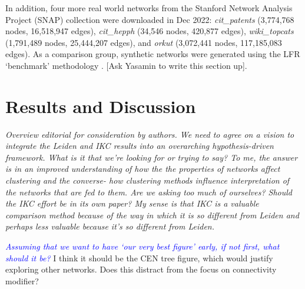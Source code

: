 \documentclass[12pt, oneside]{article}   	%
\begin{document}
In addition, four more real world networks from the Stanford Network Analysis Project (SNAP) collection \citep{leskovec2016snap} were downloaded in Dec 2022: \emph{cit\_patents} (3,774,768 nodes, 16,518,947 edges), \emph{cit\_hepph} (34,546 nodes, 420,877 edges), \emph{wiki\_topcats} (1,791,489 nodes, 25,444,207 edges), and \emph{orkut} (3,072,441 nodes, 117,185,083 edges). As a comparison group, synthetic networks were generated using the LFR `benchmark' methodology \citep{Lancichinetti2008}. [Ask Yasamin to write this section up].

\section{Results and Discussion}

\emph{Overview editorial for consideration by authors. We need to agree on a vision to integrate the Leiden and IKC results into an overarching hypothesis-driven framework. What is it that we're looking for or trying to say? To me, the answer is in an improved understanding of how the the properties of networks affect clustering and the converse- how clustering methods influence interpretation of the networks that are fed to them. Are we asking too much of ourselves? Should the IKC effort be in its own paper? My sense is that IKC is a valuable comparison method because of the way in which it is so different from Leiden and perhaps less valuable because it's so different from Leiden.}

\textcolor{blue}{\emph{Assuming that we want to have `our very best figure' early, if not first, what should it be?}} I think it should be the CEN tree figure, which would justify exploring other networks.  Does this distract from the focus on connectivity modifier?
\end{document}
